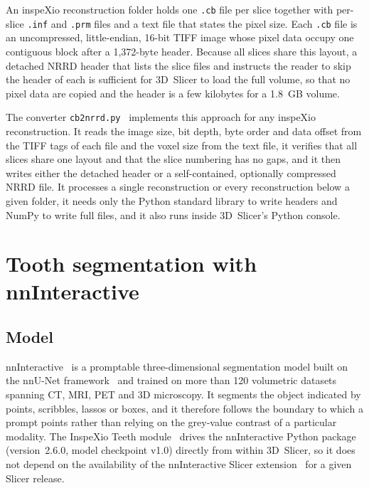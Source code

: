 \documentclass[11pt,a4paper]{article}
\begin{document}
An inspeXio reconstruction folder holds one \texttt{.cb} file per slice together with per-slice \texttt{.inf} and \texttt{.prm} files and a text file that states the pixel size. Each \texttt{.cb} file is an uncompressed, little-endian, 16-bit TIFF image whose pixel data occupy one contiguous block after a 1,372-byte header. Because all slices share this layout, a detached NRRD header that lists the slice files and instructs the reader to skip the header of each is sufficient for 3D~Slicer to load the full volume, so that no pixel data are copied and the header is a few kilobytes for a 1.8~GB volume.

The converter \texttt{cb2nrrd.py}~\cite{repoConverter} implements this approach for any inspeXio reconstruction. It reads the image size, bit depth, byte order and data offset from the TIFF tags of each file and the voxel size from the text file, it verifies that all slices share one layout and that the slice numbering has no gaps, and it then writes either the detached header or a self-contained, optionally compressed NRRD file. It processes a single reconstruction or every reconstruction below a given folder, it needs only the Python standard library to write headers and NumPy to write full files, and it also runs inside 3D~Slicer's Python console.

\section{Tooth segmentation with nnInteractive}

\subsection{Model}

nnInteractive~\cite{isensee2025nninteractive} is a promptable three-dimensional segmentation model built on the nnU-Net framework~\cite{isensee2021nnunet} and trained on more than 120 volumetric datasets spanning CT, MRI, PET and 3D microscopy. It segments the object indicated by points, scribbles, lassos or boxes, and it therefore follows the boundary to which a prompt points rather than relying on the grey-value contrast of a particular modality. The InspeXio Teeth module~\cite{repoSegmentation} drives the nnInteractive Python package (version~2.6.0, model checkpoint v1.0) directly from within 3D~Slicer, so it does not depend on the availability of the nnInteractive Slicer extension~\cite{devente2026slicernninteractive} for a given Slicer release.
\end{document}
